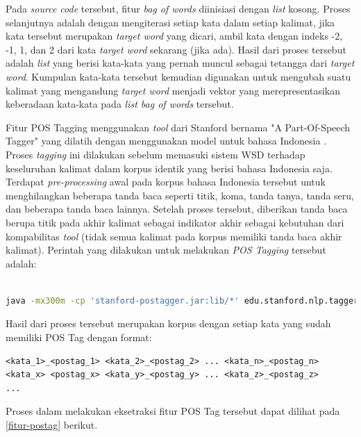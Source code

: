 Pada \textit{source code} tersebut, fitur \textit{bag of words} diinisiasi dengan \textit{list} kosong. Proses selanjutnya adalah dengan mengiterasi setiap kata dalam setiap kalimat, jika kata tersebut merupakan \textit{target word} yang dicari, ambil kata dengan indeks -2, -1, 1, dan 2 dari kata \textit{target word} sekarang (jika ada). Hasil dari proses tersebut adalah \textit{list} yang berisi kata-kata yang pernah muncul sebagai tetangga dari \textit{target word}. Kumpulan kata-kata tersebut kemudian digunakan untuk mengubah suatu kalimat yang mengandung \textit{target word} menjadi vektor yang merepresentasikan keberadaan kata-kata pada \textit{list bag of words} tersebut.

Fitur POS Tagging menggunakan \textit{tool} dari Stanford bernama "A Part-Of-Speech Tagger" yang dilatih dengan menggunakan model untuk bahasa Indonesia \citep{dinakaramani2014designing}. Proses \textit{tagging} ini dilakukan sebelum memasuki sistem WSD terhadap keseluruhan kalimat dalam korpus identik yang berisi bahasa Indonesia saja. Terdapat \textit{pre-processing} awal pada korpus bahasa Indonesia tersebut untuk menghilangkan beberapa tanda baca seperti titik, koma, tanda tanya, tanda seru, dan beberapa tanda baca lainnya. Setelah proses tersebut, diberikan tanda baca berupa titik pada akhir kalimat sebagai indikator akhir sebagai kebutuhan dari kompabilitas \textit{tool} (tidak semua kalimat pada korpus memiliki tanda baca akhir kalimat). Perintah yang dilakukan untuk melakukan \textit{POS Tagging} tersebut adalah:

\begin{lstlisting}[language=bash,caption={Stanford POS Tagger}, label={stanford-pos-tagger}]

java -mx300m -cp 'stanford-postagger.jar:lib/*' edu.stanford.nlp.tagger.maxent.MaxentTagger -model <model_bahasa_indonesia> -textFile <korpus_bahasa_indonesia>

\end{lstlisting}

Hasil dari proses tersebut merupakan korpus dengan setiap kata yang sudah memiliki POS Tag dengan format:

\begin{lstlisting}[backgroundcolor = \color{white}]
<kata_1>_<postag_1> <kata_2>_<postag_2> ... <kata_n>_<postag_n>
<kata_x> <postag_x> <kata_y>_<postag_y> ... <kata_z>_<postag_z>
...
\end{lstlisting}

Proses dalam melakukan eksetraksi fitur POS Tag tersebut dapat dilihat pada \ref{fitur-postag} berikut.

